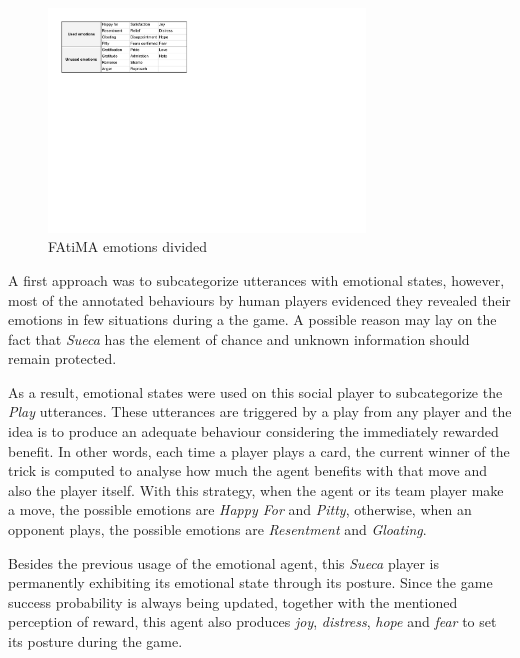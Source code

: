 \begin{figure}[ht]
	\centering
    \includegraphics[width=0.75\textwidth]{./img/6/emotions}
	\caption{FAtiMA emotions divided}
\label{fig:emotions}
\end{figure}

A first approach was to subcategorize utterances with emotional states, however, most of the annotated behaviours by human players evidenced they revealed their emotions in few situations during a the game.
A possible reason may lay on the fact that \emph{Sueca} has the element of chance and unknown information should remain protected.

As a result, emotional states were used on this social player to subcategorize the \emph{Play} utterances.
These utterances are triggered by a play from any player and the idea is to produce an adequate behaviour considering the immediately rewarded benefit.
In other words, each time a player plays a card, the current winner of the trick is computed to analyse how much the agent benefits with that move and also the player itself.
With this strategy, when the agent or its team player make a move, the possible emotions are \emph{Happy For} and \emph{Pitty}, otherwise, when an opponent plays, the possible emotions are \emph{Resentment} and \emph{Gloating}.

Besides the previous usage of the emotional agent, this \emph{Sueca} player is permanently exhibiting its emotional state through its posture.
Since the game success probability is always being updated, together with the mentioned perception of reward, this agent also produces \emph{joy}, \emph{distress}, \emph{hope} and \emph{fear} to set its posture during the game.


